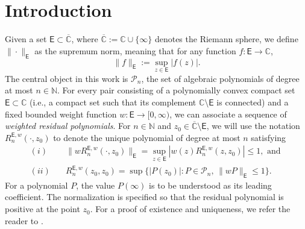 \documentclass[12pt,oneside,reqno]{amsart}
\theoremstyle{definition}
\numberwithin{equation}{section}
\newcommand{\N}{{\mathbb N}}
\newcommand{\C}{{\mathbb C}}
\newcommand{\E}{{\mathsf E}}
\newcommand{\cP}{{\mathcal{P}}}
\newcommand{\RS}{\overline{\C}}
\begin{document}
\section{Introduction}
Given a set $\E\subset \overline{\C}$, where $\overline{\C}:=\C\cup\{\infty\}$ denotes the Riemann sphere, we define $\|\cdot\|_{\E}$ as the supremum norm, meaning that for any function $f:\E\rightarrow \C$,
\[
   \|f\|_{\E} := \sup_{z\in \E}|f(z)|.
\]
The central object in this work is $\cP_n$, the set of algebraic polynomials of degree at most $n\in \N$. 
For every pair consisting of a polynomially convex compact set $\E\subset \C$ (i.e., a compact set such that its complement $\C \setminus \E$ is connected) and a fixed bounded weight function $w: \E \to [0, \infty)$, we can associate a sequence of \emph{weighted residual polynomials}. 
For $n\in \N$ and $z_0\in \RS\setminus \E$, we will use the notation $R_{n}^{\E,w}(\cdot,z_0)$ to denote the unique polynomial of degree at most $n$ satisfying
\begin{align*} 
   (i)& \quad \|wR_{n}^{\E,w}(\cdot ,z_0)\|_{\E}=\sup_{z\in \E}\left|w(z)R_n^{\E,w}(z,z_0)\right|\leq 1,  
   \mbox{ and }  \\
   (ii)& \quad R_{n}^{\E,w}(z_0,z_0) = \sup\bigl\{|P(z_0)|: P\in \cP_n,\, \|wP\|_{\E}\leq 1\bigr\}. 
\end{align*}
For a polynomial $P$, the value $P(\infty)$ is to be understood as its leading coefficient. The normalization is specified so that the residual polynomial is positive at the point $z_0$. For a proof of existence and uniqueness, we refer the reader to \cite[Theorem 2.1\,b)]{christiansen-simon-zinchenko-V}. 
\end{document}
